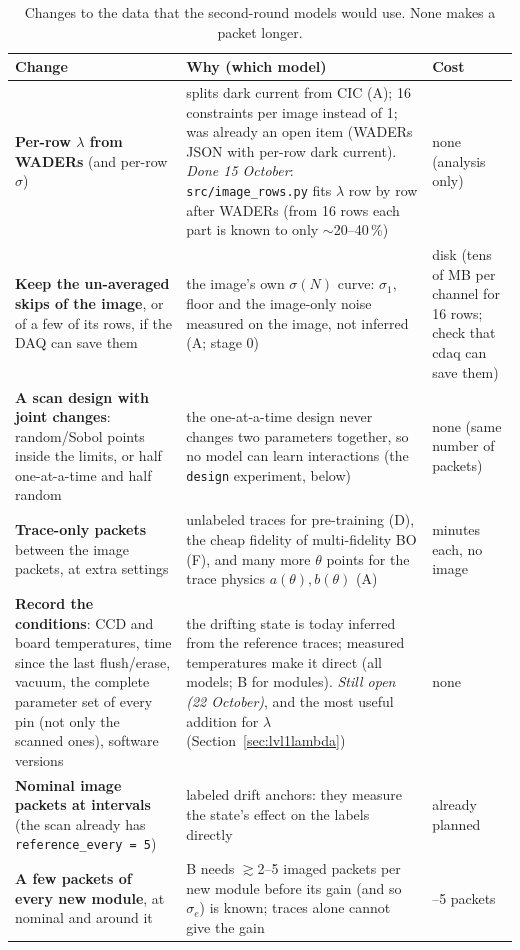 \documentclass[10pt]{article}
\newcommand{\code}[1]{\texttt{#1}}
\begin{document}
\begin{table}[htbp]
\centering\small
\begin{tabularx}{\textwidth}{>{\raggedright\arraybackslash}p{4.3cm}>{\raggedright\arraybackslash}X>{\raggedright\arraybackslash}p{2.4cm}}
\toprule
Change & Why (which model) & Cost \\
\midrule
\textbf{Per-row $\lambda$ from WADERs} (and per-row $\sigma$) & splits dark current from CIC (A); 16 constraints per image instead of 1; was already an
  open item (WADERs JSON with per-row dark current). \textit{Done 15 October}: \code{src/image\_rows.py} fits $\lambda$ row by row after WADERs
  (from 16 rows each part is known to only $\sim$20--40\,\%) & none (analysis only) \\
\textbf{Keep the un-averaged skips of the image}, or of a few of its rows, if the DAQ can save them & the image's own $\sigma(N)$ curve: $\sigma_1$,
  floor and the image-only noise measured on the image, not inferred (A; stage 0) & disk (tens of MB per channel for 16 rows; check that cdaq can save them) \\
\textbf{A scan design with joint changes}: random/Sobol points inside the limits, or half one-at-a-time and half random & the
  one-at-a-time design never changes two parameters together, so no model can learn interactions (the \code{design} experiment, below) & none
  (same number of packets) \\
\textbf{Trace-only packets} between the image packets, at extra settings & unlabeled traces for pre-training (D), the cheap fidelity of
  multi-fidelity BO (F), and many more $\theta$ points for the trace physics $a(\theta), b(\theta)$ (A) & minutes each, no image \\
\textbf{Record the conditions}: CCD and board temperatures, time since the last flush/erase, vacuum, the complete parameter set of every pin
  (not only the scanned ones), software versions & the drifting state is today inferred from the reference traces; measured temperatures
  make it direct (all models; B for modules). \textit{Still open (22 October)}, and the most useful addition for $\lambda$
  (Section~\ref{sec:lvl1lambda}) & none \\
\textbf{Nominal image packets at intervals} (the scan already has \code{reference\_every = 5}) & labeled drift anchors: they measure the
  state's effect on the labels directly & already planned \\
\textbf{A few packets of every new module}, at nominal and around it & B needs $\gtrsim$2--5 imaged packets per new module before its gain
  (and so $\sigma_e$) is known; traces alone cannot give the gain & 2--5 packets \\
\bottomrule
\end{tabularx}
\caption{Changes to the data that the second-round models would use. None makes a packet longer.}
\label{tab:dataneeds}
\end{table}
\end{document}
